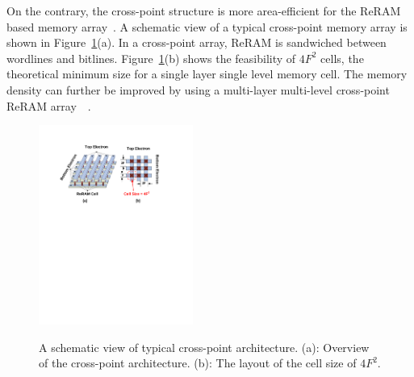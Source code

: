 On the contrary, the cross-point structure is more area-efficient for the ReRAM based memory array~\cite{memristor:Cong}. A schematic view of a typical cross-point memory array is shown in Figure~\ref{fig:array}(a). In a cross-point array, ReRAM is sandwiched between wordlines and bitlines. Figure~\ref{fig:array}(b) shows the feasibility of $4F^2$ cells, the theoretical minimum size for a single layer single level memory cell.
The memory density can further be improved by using a multi-layer multi-level cross-point ReRAM array~\cite{ReRAM_ISSCC2011_Sheu}~\cite{memristor:IEDM08_3D}.

\begin{figure}
\centering
  \includegraphics[width=0.45\textwidth]{./figures/crossbar_array2.pdf}\\\vspace{-10pt}
  \caption{A schematic view of typical cross-point architecture. (a): Overview of the cross-point architecture. (b): The layout of the cell size of $4F^2$. }\label{fig:array}
\vspace{-12pt}
\end{figure}

